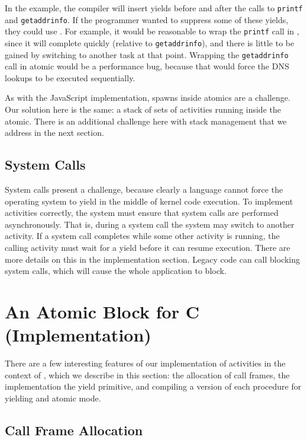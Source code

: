 \documentclass[sigplan,10pt,review,anonymous]{acmart}\settopmatter{printfolios=true,printccs=false,printacmref=false}
\begin{document}
In the example, the compiler will insert yields before and after the calls to \texttt{printf} and \texttt{getaddrinfo}.
If the programmer wanted to suppress some of these yields, they could use \atomic{}.
For example, it would be reasonable to wrap the \texttt{printf} call in \atomic{}, since it will complete quickly (relative to \texttt{getaddrinfo}), and there is little to be gained by switching to another task at that point.
Wrapping the \texttt{getaddrinfo} call in atomic would be a performance bug, because that would force the DNS lookups to be executed sequentially.

As with the JavaScript implementation, spawns inside atomics are a challenge.
Our solution here is the same: a stack of sets of activities running inside the atomic.
There is an additional challenge here with stack management that we address in the next section.

\subsection{System Calls}

System calls present a challenge, because clearly a language cannot force the operating system to yield in the middle of kernel code execution.
To implement activities correctly, the system must ensure that system calls are performed asynchronously.
That is, during a system call the system may switch to another activity.
If a system call completes while some other activity is running, the calling activity must wait for a yield before it can resume execution.
There are more details on this in the implementation section.
Legacy code can call blocking system calls, which will cause the whole application to block.

\section{An Atomic Block for C (Implementation)}

There are a few interesting features of our implementation of activities in the context of \charcoal{}, which we describe in this section: the allocation of call frames, the implementation the yield primitive, and compiling a version of each procedure for yielding and atomic mode.

\subsection{Call Frame Allocation}
\end{document}
